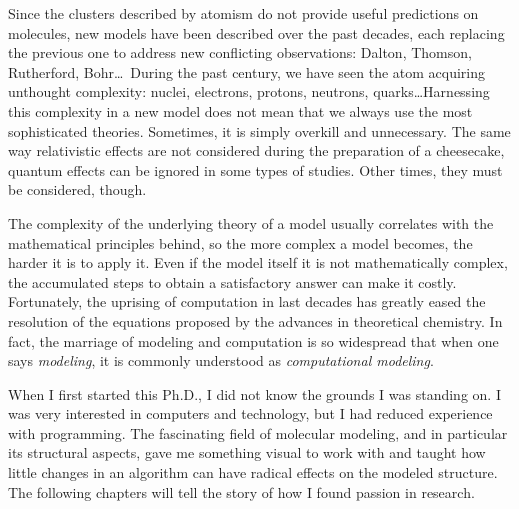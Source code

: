 Since the clusters described by atomism do not provide useful predictions on molecules, new models have been described over the past decades, each replacing the previous one to address new conflicting observations: Dalton, Thomson, Rutherford, Bohr\ldots \  During the past century, we have seen the atom acquiring unthought complexity: nuclei, electrons, protons, neutrons, quarks\ldots  Harnessing this complexity in a new model does not mean that we always use the most sophisticated theories. Sometimes, it is simply overkill and unnecessary. The same way relativistic effects are not considered during the preparation of a cheesecake, quantum effects can be ignored in some types of studies. Other times, they must be considered, though.

The complexity of the underlying theory of a model usually correlates with the mathematical principles behind, so the more complex a model becomes, the harder it is to apply it. Even if the model itself it is not mathematically complex, the accumulated steps to obtain a satisfactory answer can make it costly. Fortunately, the uprising of computation in last decades has greatly eased the resolution of the equations proposed by the advances in theoretical chemistry. In fact, the marriage of modeling and computation is so widespread that when one says \textit{modeling}, it is commonly understood as \textit{computational modeling}.


When I first started this Ph.D., I did not know the grounds I was standing on. I was very interested in computers and technology, but I had reduced experience with programming. The fascinating field of molecular modeling, and in particular its structural aspects, gave me something visual to work with and taught how little changes in an algorithm can have radical effects on the modeled structure. The following chapters will tell the story of how I found passion in research.

